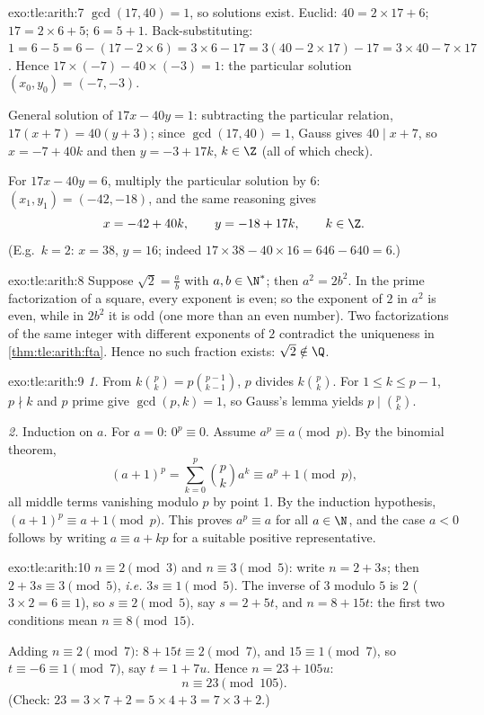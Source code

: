 \begin{solution}{exo:tle:arith:7}
$\gcd(17, 40) = 1$, so solutions exist. Euclid:
$40 = 2\times17 + 6$; $17 = 2\times6 + 5$; $6 = 5 + 1$. Back-substituting:
$1 = 6 - 5 = 6 - (17 - 2\times6) = 3\times6 - 17
= 3(40 - 2\times17) - 17 = 3\times40 - 7\times17$. Hence
$17\times(-7) - 40\times(-3) = 1$: the particular solution
$(x_0, y_0) = (-7, -3)$.

General solution of $17x - 40y = 1$: subtracting the particular relation,
$17(x + 7) = 40(y + 3)$; since $\gcd(17, 40) = 1$, Gauss gives
$40 \mid x + 7$, so $x = -7 + 40k$ and then $y = -3 + 17k$, $k \in \Z$
(all of which check).

For $17x - 40y = 6$, multiply the particular solution by $6$:
$(x_1, y_1) = (-42, -18)$, and the same reasoning gives
\[
x = -42 + 40k, \qquad y = -18 + 17k, \qquad k \in \Z .
\]
(E.g.\ $k = 2$: $x = 38$, $y = 16$; indeed $17\times38 - 40\times16
= 646 - 640 = 6$.)
\end{solution}

\begin{solution}{exo:tle:arith:8}
Suppose $\sqrt2 = \frac ab$ with $a, b \in \N^*$; then $a^2 = 2b^2$. In the
prime factorization of a square, every exponent is even; so the exponent of
$2$ in $a^2$ is even, while in $2b^2$ it is odd (one more than an even
number). Two factorizations of the same integer with different exponents of
$2$ contradict the uniqueness in \cref{thm:tle:arith:fta}. Hence no such
fraction exists: $\sqrt2 \notin \Q$.
\end{solution}

\begin{solution}{exo:tle:arith:9}
\emph{1.} From $k\binom pk = p \binom{p-1}{k-1}$, $p$ divides
$k\binom pk$. For $1 \leq k \leq p-1$, $p \nmid k$ and $p$ prime give
$\gcd(p, k) = 1$, so Gauss's lemma yields $p \mid \binom pk$.

\emph{2.} Induction on $a$. For $a = 0$: $0^p \equiv 0$. Assume
$a^p \equiv a \pmod p$. By the binomial theorem,
\[
(a+1)^p = \sum_{k=0}^{p} \binom pk a^k
\equiv a^p + 1 \pmod p,
\]
all middle terms vanishing modulo $p$ by point 1. By the induction
hypothesis, $(a+1)^p \equiv a + 1 \pmod p$. This proves
$a^p \equiv a$ for all $a \in \N$, and the case $a < 0$ follows by writing
$a \equiv a + kp$ for a suitable positive representative.
\end{solution}

\begin{solution}{exo:tle:arith:10}
$n \equiv 2 \pmod 3$ and $n \equiv 3 \pmod 5$: write $n = 2 + 3s$; then
$2 + 3s \equiv 3 \pmod 5$, \emph{i.e.} $3s \equiv 1 \pmod 5$. The inverse of
$3$ modulo $5$ is $2$ ($3\times2 = 6 \equiv 1$), so $s \equiv 2 \pmod 5$,
say $s = 2 + 5t$, and $n = 8 + 15t$: the first two conditions mean
$n \equiv 8 \pmod{15}$.

Adding $n \equiv 2 \pmod 7$: $8 + 15t \equiv 2 \pmod 7$, and
$15 \equiv 1 \pmod 7$, so $t \equiv -6 \equiv 1 \pmod 7$, say
$t = 1 + 7u$. Hence $n = 23 + 105u$:
\[
n \equiv 23 \pmod{105}.
\]
(Check: $23 = 3\times7 + 2 = 5\times4 + 3 = 7\times3 + 2$.)
\end{solution}
